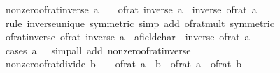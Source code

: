 \begin{isabellebody}
%
\endisadelimproof
\isanewline
{}\isamarkupfalse%
\ nonzero{\isacharunderscore}{\kern0pt}of{\isacharunderscore}{\kern0pt}rat{\isacharunderscore}{\kern0pt}inverse{\isacharcolon}{\kern0pt}\ {\isachardoublequoteopen}a\ {\isasymnoteq}\ {}\ {\isasymLongrightarrow}\ of{\isacharunderscore}{\kern0pt}rat\ {\isacharparenleft}{\kern0pt}inverse\ a{\isacharparenright}{\kern0pt}\ {\isacharequal}{\kern0pt}\ inverse\ {\isacharparenleft}{\kern0pt}of{\isacharunderscore}{\kern0pt}rat\ a{\isacharparenright}{\kern0pt}{\isachardoublequoteclose}\isanewline
%
\isadelimproof
\ \ %
\endisadelimproof
%
\isatagproof
{}\isamarkupfalse%
\ {\isacharparenleft}{\kern0pt}rule\ inverse{\isacharunderscore}{\kern0pt}unique\ {\isacharbrackleft}{\kern0pt}symmetric{\isacharbrackright}{\kern0pt}{\isacharparenright}{\kern0pt}\ {\isacharparenleft}{\kern0pt}simp\ add{\isacharcolon}{\kern0pt}\ of{\isacharunderscore}{\kern0pt}rat{\isacharunderscore}{\kern0pt}mult\ {\isacharbrackleft}{\kern0pt}symmetric{\isacharbrackright}{\kern0pt}{\isacharparenright}{\kern0pt}%
\endisatagproof
{\isafoldproof}%
%
\isadelimproof
\isanewline
%
\endisadelimproof
\isanewline
{}\isamarkupfalse%
\ of{\isacharunderscore}{\kern0pt}rat{\isacharunderscore}{\kern0pt}inverse{\isacharcolon}{\kern0pt}\ {\isachardoublequoteopen}{\isacharparenleft}{\kern0pt}of{\isacharunderscore}{\kern0pt}rat\ {\isacharparenleft}{\kern0pt}inverse\ a{\isacharparenright}{\kern0pt}\ {\isacharcolon}{\kern0pt}{\isacharcolon}{\kern0pt}\ {\isacharprime}{\kern0pt}a{\isacharcolon}{\kern0pt}{\isacharcolon}{\kern0pt}field{\isacharunderscore}{\kern0pt}char{\isacharunderscore}{\kern0pt}{}{\isacharparenright}{\kern0pt}\ {\isacharequal}{\kern0pt}\ inverse\ {\isacharparenleft}{\kern0pt}of{\isacharunderscore}{\kern0pt}rat\ a{\isacharparenright}{\kern0pt}{\isachardoublequoteclose}\isanewline
%
\isadelimproof
\ \ %
\endisadelimproof
%
\isatagproof
{}\isamarkupfalse%
\ {\isacharparenleft}{\kern0pt}cases\ {\isachardoublequoteopen}a\ {\isacharequal}{\kern0pt}\ {}{\isachardoublequoteclose}{\isacharparenright}{\kern0pt}\ {\isacharparenleft}{\kern0pt}simp{\isacharunderscore}{\kern0pt}all\ add{\isacharcolon}{\kern0pt}\ nonzero{\isacharunderscore}{\kern0pt}of{\isacharunderscore}{\kern0pt}rat{\isacharunderscore}{\kern0pt}inverse{\isacharparenright}{\kern0pt}%
\endisatagproof
{\isafoldproof}%
%
\isadelimproof
\isanewline
%
\endisadelimproof
\isanewline
{}\isamarkupfalse%
\ nonzero{\isacharunderscore}{\kern0pt}of{\isacharunderscore}{\kern0pt}rat{\isacharunderscore}{\kern0pt}divide{\isacharcolon}{\kern0pt}\ {\isachardoublequoteopen}b\ {\isasymnoteq}\ {}\ {\isasymLongrightarrow}\ of{\isacharunderscore}{\kern0pt}rat\ {\isacharparenleft}{\kern0pt}a\ {\isacharslash}{\kern0pt}\ b{\isacharparenright}{\kern0pt}\ {\isacharequal}{\kern0pt}\ of{\isacharunderscore}{\kern0pt}rat\ a\ {\isacharslash}{\kern0pt}\ of{\isacharunderscore}{\kern0pt}rat\ b{\isachardoublequoteclose}\isanewline

\end{isabellebody}
